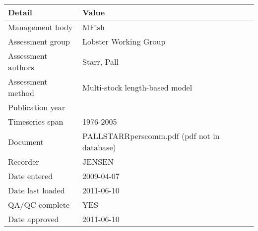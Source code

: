 \begin{table}[htb]
\centering
\begin{tabular}{ll}
\toprule
Detail & Value \\
\midrule
Management body    & MFish                                       \\
Assessment group   & Lobster Working Group                       \\
Assessment authors & Starr, Pall                                 \\
Assessment method  & Multi-stock length-based model              \\
Publication year   &                                             \\
Timeseries span    & 1976-2005                                   \\
Document           & PALLSTARRperscomm.pdf (pdf not in database) \\
Recorder           & JENSEN                                      \\
Date entered       & 2009-04-07                                  \\
Date last loaded   & 2011-06-10                                  \\
QA/QC complete     & YES                                         \\
Date approved      & 2011-06-10                                  \\
\bottomrule
\end{tabular}
\label{tab:assessdet}
\end{table}
